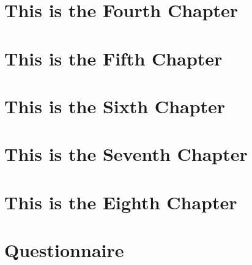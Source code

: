 \documentclass[12pt]{cwru_thesis}
\begin{document}
\chapter{This is the Fourth Chapter}
\chapter{This is the Fifth Chapter}
\chapter{This is the Sixth Chapter}
\chapter{This is the Seventh Chapter}
\chapter{This is the Eighth Chapter}


\appendix

\chapter{Questionnaire}

\printbibliography[heading=bibintoc]
\end{document}
